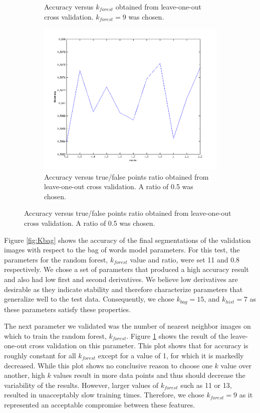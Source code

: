 \documentclass{article} %
\begin{document}
\begin{figure}[htb]
\begin{subfigure}[t]{0.33\textwidth}
		\parbox{0.95\textwidth}{\caption{Accuracy versus $k_{forest}$ obtained from leave-one-out cross validation. $k_{forest} = 9$ was chosen. \label{fig:Kforest}}}
	\end{subfigure}
	\begin{subfigure}[t]{0.33\textwidth}
		\centering
		\includegraphics[width = \textwidth]{./img/ratio}
		\parbox{0.95\textwidth}{\caption{Accuracy versus true/false points ratio obtained from leave-one-out cross validation. A ratio  of 0.5 was chosen. \label{fig:ratio}}}
	\end{subfigure}
\end{figure}

Figure \ref{fig:Kbag} shows the accuracy of the final segmentations of the validation images with respect to the bag of words model parameters. 
For this test, the parameters for the random forest, $k_{forest}$ value and ratio, were set 11 and 0.8 respectively. 
We chose a set of parameters that produced a high accuracy result and also had low first and second derivatives. We believe low derivatives are desirable as they indicate stability and therefore characterize parameters that generalize well to the test data. 
Consequently, we chose $k_{bag} = 15$, and $k_{hist} = 7$ as these parameters satisfy these properties.

The next parameter we validated was the number of nearest neighbor images on which to train the random forest, $k_{forest}$. 
Figure \ref{fig:Kforest} shows the result of the leave-one-out cross validation on this parameter. This plot shows that for accuracy is roughly constant for all $k_{forest}$ except for a value of 1, for which it is markedly decreased. 
While this plot shows no conclusive reason to choose one $k$ value over another, high $k$ values result in more data points and thus should decrease the variability of the results. 
However, larger values of $k_{forest}$ such as 11 or 13, resulted in unacceptably slow training times. 
Therefore, we chose $k_{forest} = 9$ as it represented an acceptable compromise between these features.
\end{document}
